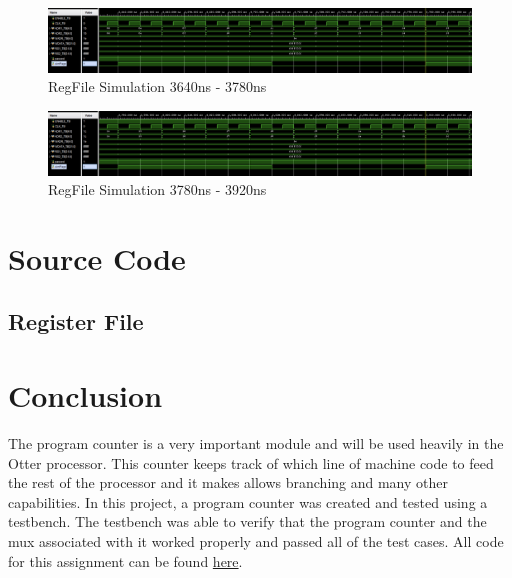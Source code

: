 \documentclass[
    a4paper, %
	12pt, %
    ]{CSSullivanBusinessReport}
\begin{document}
\begin{fullwidth}
\begin{figure}
    \centering
    \captionsetup{style=widetable}
    \includegraphics[width=.80\pdfpagewidth]{Figures/RegFile Simulation 26.png}
    \caption{RegFile Simulation 3640ns - 3780ns}
    \label{fig:regfilesim27}
\end{figure}

\begin{figure}
    \centering
    \captionsetup{style=widetable}
    \includegraphics[width=.8\pdfpagewidth]{Figures/RegFile Simulation 27.png}
    \caption{RegFile Simulation 3780ns - 3920ns}
    \label{fig:regfilesim28}
\end{figure}


\newpage
\section{Source Code}
\captionsetup{style=widetable}
\subsection{Register File} %



\newpage



\section {Conclusion} %
\hypersetup{urlcolor=blue} 
The program counter is a very important module and will be used heavily in the Otter processor. This counter keeps track of which line of machine code to feed the rest of the processor and it makes allows branching and many other capabilities. In this project, a program counter was created and tested using a testbench. The testbench was able to verify that the program counter and the mux associated with it worked properly and passed all of the test cases.
All code for this assignment can be found \href{https://github.com/EthanV1920/CPE-233-Otter/tree/main}{here}.


\end{fullwidth}
\end{document}
